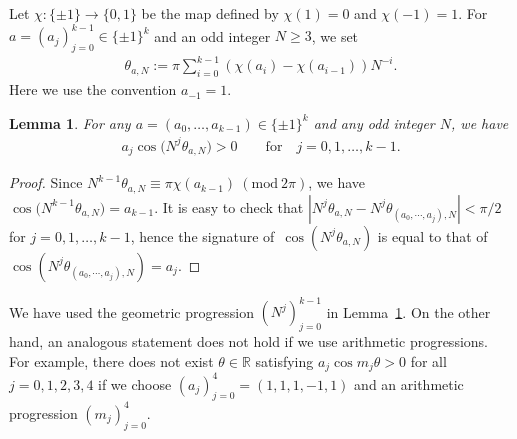 \documentclass[11pt]{article}
\numberwithin{equation}{section}
\numberwithin{equation}{section}
\newtheorem{Lemma}[Theorem]{Lemma}
\begin{document}
Let $\chi\colon\{\pm 1\} \rightarrow \{0,1\}$ be
the map defined by $\chi(1) = 0$ and $\chi(-1) = 1$.
For $a = (a_j)_{j=0}^{k-1} \in \{\pm1\}^{k}$ and an odd integer $N\geq 3$,
we set
\begin{align*}%
\theta_{a,N} := \pi\sum_{i=0}^{k-1} (\chi(a_i) - \chi(a_{i-1}))N^{-i}.
\end{align*}
Here we use the convention $a_{-1}=1$.
\begin{Lemma}\label{sekoi}
For any $a=(a_{0},\ldots,a_{k-1})\in \{\pm1\}^{k}$ and any odd integer $N$,
we have
\begin{gather*}
a_j\cos\big(N^{j}\theta_{a,N}\big) > 0 \qquad \text{for}\quad j=0,1,\ldots,k-1.
\end{gather*}
\end{Lemma}

\begin{proof}
Since
$N^{k-1}\theta_{a,N} \equiv \pi \chi(a_{k-1}) \ (\mathrm{mod}\ 2\pi)$,
we have $\cos \big(N^{k-1} \theta_{a,N}\big) = a_{k-1}$.
It is easy to check that
$|N^{j} \theta_{a,N} - N^{j} \theta_{(a_0,\cdots,a_j),N}| < \pi/2$ for $j=0,1,\ldots,k-1$,
hence the signature of~$\cos (N^{j} \theta_{a,N})$ is equal to that of
$\cos (N^{j} \theta_{(a_0,\cdots,a_j),N}) = a_j$.
\end{proof}

\begin{Remark}
We have used the geometric progression $(N^{j})_{j=0}^{k-1}$ in Lemma~\ref{sekoi}.
On the other hand, an analogous statement does not hold if
we use arithmetic progressions. For example,
there does not exist $\theta \in \mathbb{R}$
satisfying $a_j\cos m_j\theta > 0$ for all $j=0,1,2,3,4$
if we choose $(a_j)_{j=0}^{4}=(1,1,1,-1,1)$ and
an arithmetic progression $(m_j)_{j=0}^{4}$.
\end{Remark}
\end{document}
